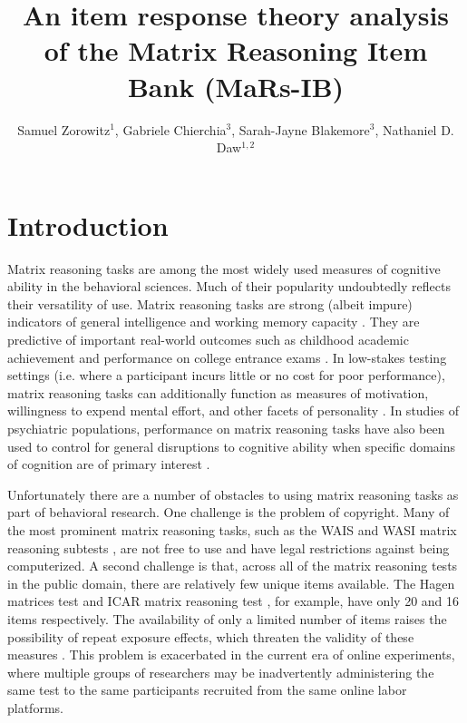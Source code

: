 \documentclass[a4paper,man,natbib]{apa6}
\title{An item response theory analysis of the Matrix Reasoning Item Bank (MaRs-IB)}
\author{Samuel Zorowitz$^1$, Gabriele Chierchia$^3$, Sarah-Jayne Blakemore$^3$, Nathaniel D. Daw$^{1,2}$}
\affiliation{$^1$Princeton Neuroscience Institute, Princeton University, USA\\$^2$Department of Psychology, Princeton University, USA\\$^3$Department of Psychology, University of Cambridge, Downing Street, Cambridge, UK}
\begin{document}
\maketitle

\section{Introduction}

Matrix reasoning tasks are among the most widely used measures of cognitive ability in the behavioral sciences. Much of their popularity undoubtedly reflects their versatility of use. Matrix reasoning tasks are strong (albeit impure) indicators of general intelligence \citep{gignac2015raven} and working memory capacity \citep{kane2004generality, unsworth2005working}. They are predictive of important real-world outcomes such as childhood academic achievement \citep{roth2015intelligence} and performance on college entrance exams \citep{frey2004scholastic, koenig2008act}. In low-stakes testing settings (i.e. where a participant incurs little or no cost for poor performance), matrix reasoning tasks can additionally function as measures of motivation, willingness to expend mental effort, and other facets of personality \citep{duckworth2011role, gignac2019maximum}. In studies of psychiatric populations, performance on matrix reasoning tasks have also been used to control for general disruptions to cognitive ability when specific domains of cognition are of primary interest \citep{gillan2016characterizing, rouault2018psychiatric, moutoussis2021decision}.

Unfortunately there are a number of obstacles to using matrix reasoning tasks as part of behavioral research. One challenge is the problem of copyright. Many of the most prominent matrix reasoning tasks, such as the WAIS and WASI matrix reasoning subtests \citep{wechsler1999wechsler, corporation2008wechsler}, are not free to use and have legal restrictions against being computerized. A second challenge is that, across all of the matrix reasoning tests in the public domain, there are relatively few unique items available. The Hagen matrices test \citep{heydasch2014hagen} and ICAR matrix reasoning test \citep{condon2014international}, for example, have only 20 and 16 items respectively. The availability of only a limited number of items raises the possibility of repeat exposure effects, which threaten the validity of these measures  \citep{ng1974applicability, bors2003effect}. This problem is exacerbated in the current era of online experiments, where multiple groups of researchers may be inadvertently administering the same test to the same participants recruited from the same online labor platforms.
\end{document}

